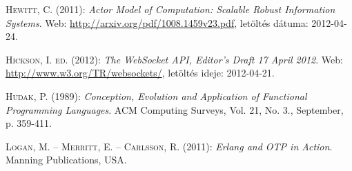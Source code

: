 \documentclass[12pt, a4paper, oneside]{book}
\begin{document}
\begin{thebibliography}{9}
{\scshape Hewitt, C.} (2011): \emph{Actor Model of Computation: Scalable Robust
Information Systems}. Web: \url{http://arxiv.org/pdf/1008.1459v23.pdf},
letöltés dátuma: 2012-04-24.

{\scshape Hickson, I. ed.} (2012): \emph{The WebSocket API, Editor's Draft 17
April 2012}. Web: \url{http://www.w3.org/TR/websockets/}, letöltés ideje:
2012-04-21.

{\scshape Hudak, P.} (1989): \emph{Conception, Evolution and Application of Functional
Programming Languages}. ACM Computing Surveys, Vol. 21, No. 3., September, p.
359-411.

{\scshape Logan, M. -- Merritt, E. -- Carlsson, R.} (2011): \emph{Erlang and OTP in Action}.
Manning Publications, USA.

\end{thebibliography}

\clearpage
{}
\printindex
\end{document}

